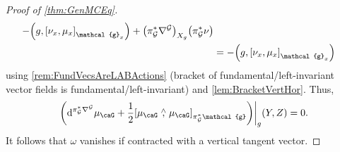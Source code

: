\documentclass[reqno,a4paper,oneside]{amsart}
\newcommand\mutot{\mu_\caG}
\theoremstyle{plain}
\theoremstyle{remark}
\theoremstyle{definition}
\begin{document}
\begin{proof}[Proof of \ref{thm:GenMCEq}]
\begin{align*}
	- \mleft( g, \mleft[ \nu_x, \mu_x \mright]_{\mathcal{g}_x} \mright)
	+ \mleft( \pi^*_{\mathcal{G}}\nabla^{\mathcal{G}} \mright)_{X_g}\mleft( \pi^*_{\mathcal{G}}\nu \mright)
\\
&=
- \mleft( g, \mleft[ \nu_x, \mu_x \mright]_{\mathcal{g}_x} \mright)
\end{align*}
using \ref{rem:FundVecsAreLABActions} (bracket of fundamental/left-invariant vector fields is fundamental/left-invariant) and \ref{lem:BracketVertHor}. Thus,
\begin{equation*}
\mleft.\mleft(\mathrm{d}^{\pi_{\mathcal{G}}^*\nabla^{\mathcal{G}}} \mutot
	+ \frac{1}{2} \mleft[ \mutot \stackrel{\wedge}{,} \mutot \mright]_{\pi_{\mathcal{G}}^*\mathcal{g}}\mright)\mright|_g(Y, Z)
=
0.
\end{equation*}
It follows that $\omega$ vanishes if contracted with a vertical tangent vector.


\end{proof}
\end{document}

